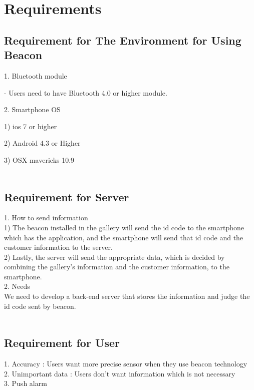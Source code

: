 \documentclass[conference]{IEEEtran}
\begin{document}
\section{Requirements}

\subsection{Requirement for The Environment for Using Beacon}

1. Bluetooth module

- Users need to have Bluetooth 4.0 or higher module.

2. Smartphone OS

1) ios 7 or higher

2) Android 4.3 or Higher

3) OSX mavericks 10.9\\\\

\subsection{Requirement for Server}
1. How to send information\\

1) The beacon installed in the gallery will send the id code to the smartphone which has the application, and the smartphone will send that id code and the customer information to the server. \\

2) Lastly, the server will send the appropriate data, which is decided by combining the gallery’s information and the customer information, to the smartphone.\\

2.  Needs\\
 We need to develop a back-end server that stores the information and judge the id code sent by beacon.\\\\

\subsection{Requirement for User}
1. Accuracy : Users want more precise sensor when they use beacon technology\\

2. Unimportant data : Users don’t want information which is not necessary\\

3. Push alarm
\end{document}
